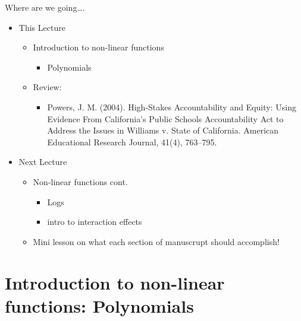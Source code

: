 \documentclass[
  8pt,
  ignorenonframetext,
  dvipsnames]{beamer}
\providecommand{\tightlist}{%
  \setlength{\itemsep}{0pt}\setlength{\parskip}{0pt}}
\let\olditem\item
\renewcommand{\item}{%
  \olditem\vspace{4pt}
}
\begin{document}
\begin{frame}{Where are we going\ldots.}
\protect\hypertarget{where-are-we-going.}{}

\begin{itemize}
\tightlist
\item
  This Lecture

  \begin{itemize}
  \tightlist
  \item
    Introduction to non-linear functions

    \begin{itemize}
    \tightlist
    \item
      Polynomials
    \end{itemize}
  \item
    Review:

    \begin{itemize}
    \tightlist
    \item
      Powers, J. M. (2004). High-Stakes Accountability and Equity: Using
      Evidence From California's Public Schools Accountability Act to
      Address the Issues in Williams v. State of California. American
      Educational Research Journal, 41(4), 763--795.
    \end{itemize}
  \end{itemize}
\item
  Next Lecture

  \begin{itemize}
  \tightlist
  \item
    Non-linear functions cont.

    \begin{itemize}
    \tightlist
    \item
      Logs
    \item
      intro to interaction effects
    \end{itemize}
  \item
    Mini lesson on what each section of manuscrupt should accomplish!
  \end{itemize}
\end{itemize}

\end{frame}

\hypertarget{introduction-to-non-linear-functions-polynomials}{%
\section{Introduction to non-linear functions:
Polynomials}\label{introduction-to-non-linear-functions-polynomials}}
\end{document}

